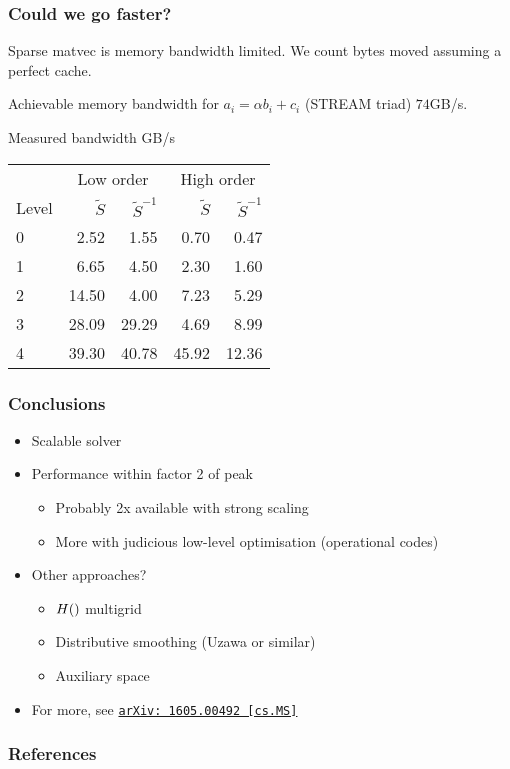 \documentclass[presentation]{beamer}
\let\div\relax
\DeclareMathOperator{\div}{div}
\newcommand{\arxivlink}[2]{%
  \href{http://www.arxiv.org/abs/#1}%
  {{\small\texttt{arXiv:\,#1\,[#2]}}}%
}
\begin{document}
\begin{frame}
  \frametitle{Could we go faster?}
  Sparse matvec is memory bandwidth limited.  We count bytes moved
  assuming a perfect cache.

  Achievable memory bandwidth for $a_i = \alpha b_i + c_i$ (STREAM triad) $74$GB/s.

  \begin{block}{Measured bandwidth GB/s}
    \begin{center}
      \begin{tabular}{lrrrr}
        & \multicolumn{2}{c}{Low order} & \multicolumn{2}{c}{High order}\\
        Level & $\tilde{S}$ & $\tilde{S}^{-1}$ & $\tilde{S}$ & $\tilde{S}^{-1}$\\
        0  &   2.52 &   1.55 &    0.70 &   0.47\\
        1  &   6.65 &   4.50 &    2.30 &   1.60\\
        2  &  14.50 &   4.00 &    7.23 &   5.29\\
        3  &  28.09 &  29.29 &    4.69 &   8.99\\
        4  &  39.30 &  40.78 &   45.92 &  12.36\\
      \end{tabular}
    \end{center}
  \end{block}
\end{frame}

\begin{frame}
  \frametitle{Conclusions}

  \begin{itemize}
  \item Scalable solver
  \item Performance within factor 2 of peak
    \begin{itemize}
    \item Probably 2x available with strong scaling
    \item More with judicious low-level optimisation (operational
      codes)
    \end{itemize}
  \item Other approaches?
    \begin{itemize}
    \item $H(\div)$ multigrid \parencite{Arnold:2000}
    \item Distributive smoothing (Uzawa or similar)
    \item Auxiliary space \parencite{Hiptmair:2007}
    \end{itemize}
  \item For more, see \arxivlink{1605.00492}{cs.MS}
  \end{itemize}
\end{frame}

\appendix
\begin{frame}
  \frametitle{References}
  \printbibliography[heading=none]
\end{frame}
\end{document}
